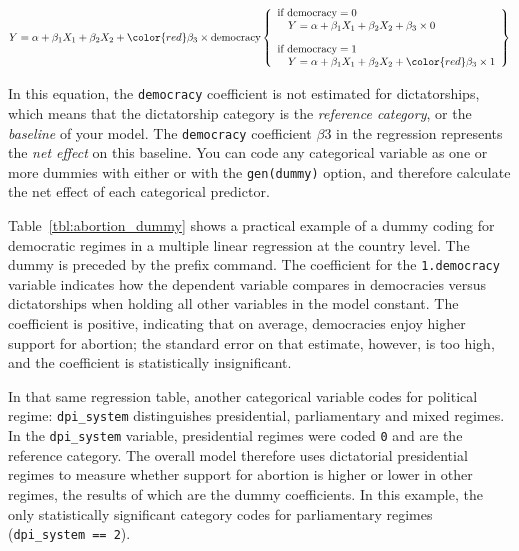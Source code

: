 	\[
	  Y = \alpha + \beta_1 X_1 + \beta_2 X_2 + {\color{red}\beta_3 \times \text{democracy}} \left\{ 
	  \begin{array}{l l}
	    \text{if~democracy}=0 \\ \quad Y = \alpha + \beta_1 X_1 + \beta_2 X_2 + \beta_3 \times 0\\[1em]
	    \text{if~democracy}=1 \\ \quad Y = \alpha + \beta_1 X_1 + \beta_2 X_2 + \color{red}\beta_3 \times 1\\
	  \end{array}\right\}
	\]
	
	In this equation, the \texttt{democracy} coefficient is not estimated for dictatorships, which means that the dictatorship category is the \emph{reference category}, or the \emph{baseline} of your model. The \texttt{democracy} coefficient $\beta 3$ in the regression represents the \emph{net effect} on this baseline. You can code any categorical variable as one or more dummies with either  or  with the \texttt{gen(dummy)} option, and therefore calculate the net effect of each categorical predictor.

	Table~\ref{tbl:abortion_dummy} shows a practical example of a dummy coding for democratic regimes in a multiple linear regression at the country level. The dummy is preceded by the  prefix command. The coefficient for the \texttt{1.democracy} variable indicates how the dependent variable compares in democracies versus dictatorships when holding all other variables in the model constant. The coefficient is positive, indicating that on average, democracies enjoy higher support for abortion; the standard error on that estimate, however, is too high, and the coefficient is statistically insignificant.

	In that same regression table, another categorical variable codes for political regime: \texttt{dpi\_system} distinguishes presidential, parliamentary and mixed regimes. In the \texttt{dpi\_system} variable, presidential regimes were coded \texttt{0} and are the reference category. The overall model therefore uses dictatorial presidential regimes to measure whether support for abortion is higher or lower in other regimes, the results of which are the dummy coefficients. In this example, the only statistically significant category codes for parliamentary regimes (\texttt{dpi\_system~==~2}).

